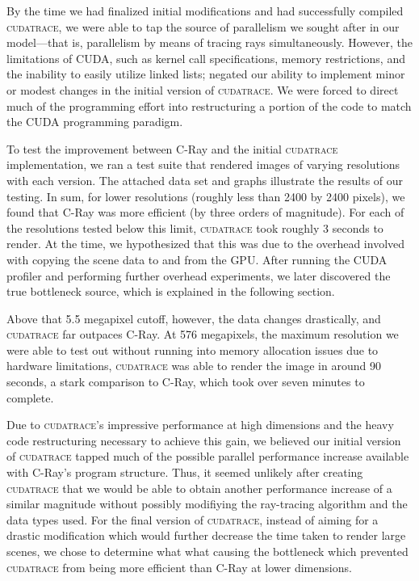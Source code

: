 \documentclass[12pt]{article}
\begin{document}
By the time we had finalized initial modifications and had successfully compiled \textsc{cudatrace}, we were able to tap the source of parallelism we sought after in our model---that is, parallelism by means of tracing rays simultaneously. However, the limitations of CUDA, such as kernel call specifications, memory restrictions, and the inability to easily utilize linked lists; negated our ability to implement minor or modest changes in the initial version of \textsc{cudatrace}. We were forced to direct much of the programming effort into restructuring a portion of the code to match the CUDA programming paradigm.

To test the improvement between C-Ray and the initial \textsc{cudatrace} implementation, we ran a test suite that rendered images of varying resolutions with each version. The attached data set and graphs illustrate the results of our testing. In sum, for lower resolutions (roughly less than 2400 by 2400 pixels), we found that C-Ray was more efficient (by three orders of magnitude). For each of the resolutions tested below this limit, \textsc{cudatrace} took roughly 3 seconds to render. At the time, we hypothesized that this was due to the overhead involved with copying the scene data to and from the GPU. After running the CUDA profiler and performing further overhead experiments, we later discovered the true bottleneck source, which is explained in the following section. 


Above that 5.5 megapixel cutoff, however, the data changes drastically, and \textsc{cudatrace} far outpaces C-Ray. At 576 megapixels, the maximum resolution we were able to test out without running into memory allocation issues due to hardware limitations, \textsc{cudatrace} was able to render the image in around 90 seconds, a stark comparison to C-Ray, which took over seven minutes to complete. 


Due to \textsc{cudatrace}’s impressive performance at high dimensions and the heavy code restructuring necessary to achieve this gain, we believed our initial version of \textsc{cudatrace} tapped much of the possible parallel performance increase available with C-Ray’s program structure. Thus, it seemed unlikely after creating \textsc{cudatrace} that we would be able to obtain another performance increase of a similar magnitude without possibly modifiying the ray-tracing algorithm and the data types used. For the final version of \textsc{cudatrace}, instead of aiming for a drastic modification which would further decrease the time taken to render large scenes, we chose to determine what what causing the bottleneck which prevented \textsc{cudatrace} from being more efficient than C-Ray at lower dimensions.
\end{document}
